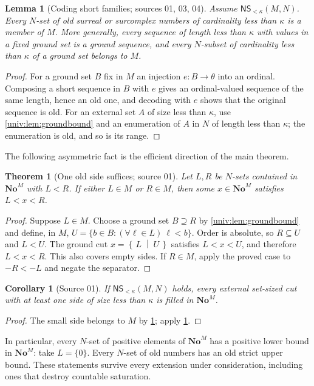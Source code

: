 \documentclass[11pt,letterpaper]{article}
\numberwithin{equation}{section}
\newtheorem{theorem}{Theorem}[section]
\newtheorem{lemma}[lemma]{Lemma}
\newtheorem{corollary}[corollary]{Corollary}
\theoremstyle{definition}
\theoremstyle{remark}
\newcommand{\No}{\mathbf{No}}
\newcommand{\NoM}{\No^{M}}
\newcommand{\NS}{\mathsf{NS}}
\newcommand{\cut}[2]{\left\{\,#1\;\middle|\;#2\,\right\}}
\begin{document}
\begin{lemma}[Coding short families; sources 01, 03, 04]\label{univ:lem:shortold}
Assume $\NS_{<\kappa}(M,N)$. Every $N$-set of old surreal or surcomplex numbers
of cardinality less than $\kappa$ is a member of $M$. More generally, every
sequence of length less than $\kappa$ with values in a fixed ground set is a
ground sequence, and every $N$-subset of cardinality less than $\kappa$ of a
ground set belongs to $M$.
\end{lemma}
\begin{proof}
For a ground set $B$ fix in $M$ an injection $e:B\to\theta$ into an ordinal.
Composing a short sequence in $B$ with $e$ gives an ordinal-valued sequence of
the same length, hence an old one, and decoding with $e$ shows that the
original sequence is old. For an external set $A$ of size less than $\kappa$,
use \cref{univ:lem:groundbound} and an enumeration of $A$ in $N$ of length less
than $\kappa$; the enumeration is old, and so is its range.
\end{proof}

The following asymmetric fact is the efficient direction of the main theorem.

\begin{theorem}[One old side suffices; source 01]\label{univ:thm:oneside}
Let $L,R$ be $N$-sets contained in $\NoM$ with $L<R$. If either $L\in M$ or
$R\in M$, then some $x\in\NoM$ satisfies $L<x<R$.
\end{theorem}
\begin{proof}
Suppose $L\in M$. Choose a ground set $B\supseteq R$ by
\cref{univ:lem:groundbound} and define, in $M$,
$U=\{b\in B:(\forall\ell\in L)\ \ell<b\}$. Order is absolute, so
$R\subseteq U$ and $L<U$. The ground cut $x=\cut LU$ satisfies $L<x<U$, and
therefore $L<x<R$. This also covers empty sides. If $R\in M$, apply the proved
case to $-R<-L$ and negate the separator.
\end{proof}

\begin{corollary}[Source 01]\label{univ:cor:NSoneside}
If $\NS_{<\kappa}(M,N)$ holds, every external set-sized cut with at least one
side of size less than $\kappa$ is filled in $\NoM$.
\end{corollary}
\begin{proof}
The small side belongs to $M$ by \cref{univ:lem:shortold}; apply
\cref{univ:thm:oneside}.
\end{proof}

In particular, every $N$-set of positive elements of $\NoM$ has a positive
lower bound in $\NoM$: take $L=\{0\}$. Every $N$-set of old numbers has an old
strict upper bound. These statements survive every extension under
consideration, including ones that destroy countable saturation.
\end{document}
